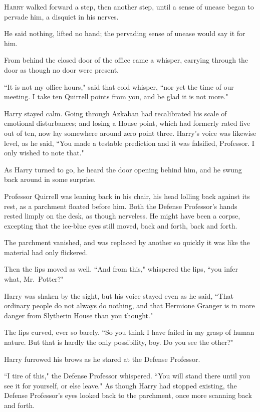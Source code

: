 
\lettrine{H}{arry} walked forward a step, then another step, until a sense of unease began to pervade him, a disquiet in his nerves.

He said nothing, lifted no hand; the pervading sense of unease would say it for him.

From behind the closed door of the office came a whisper, carrying through the door as though no door were present.

``It is not my office hours," said that cold whisper, ``nor yet the time of our meeting. I take ten Quirrell points from you, and be glad it is not more."

Harry stayed calm. Going through Azkaban had recalibrated his scale of emotional disturbances; and losing a House point, which had formerly rated five out of ten, now lay somewhere around zero point three. Harry's voice was likewise level, as he said, ``You made a testable prediction and it was falsified, Professor. I only wished to note that."

As Harry turned to go, he heard the door opening behind him, and he swung back around in some surprise.

Professor Quirrell was leaning back in his chair, his head lolling back against its rest, as a parchment floated before him. Both the Defense Professor's hands rested limply on the desk, as though nerveless. He might have been a corpse, excepting that the ice-blue eyes still moved, back and forth, back and forth.

The parchment vanished, and was replaced by another so quickly it was like the material had only flickered.

Then the lips moved as well. ``And from this," whispered the lips, ``you infer what, Mr.~Potter?"

Harry was shaken by the sight, but his voice stayed even as he said, ``That ordinary people do not always do nothing, and that Hermione Granger is in more danger from Slytherin House than you thought."

The lips curved, ever so barely. ``So you think I have failed in my grasp of human nature. But that is hardly the only possibility, boy. Do you see the other?"

Harry furrowed his brows as he stared at the Defense Professor.

``I tire of this," the Defense Professor whispered. ``You will stand there until you see it for yourself, or else leave." As though Harry had stopped existing, the Defense Professor's eyes looked back to the parchment, once more scanning back and forth.

